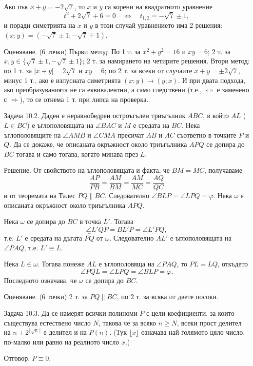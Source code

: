 Ако пък $x+y=-2\sqrt7$, то $x$ и $y$ са корени на квадратното уравнение
$$
t^2+2\sqrt7+6=0\quad\Longleftrightarrow\quad t_{1,2}=-\sqrt7\pm1,
$$
и поради симетрията на $x$ и $y$ в този случай уравнението има 2 решения: $(x;y)=(-\sqrt7\pm1;-\sqrt7\mp1)$.

Оценяване. (6 точки) Първи метод: По 1 т. за $x^2+y^2=16$ и $xy=6$; 2 т. за $x,y\in\{\sqrt7\pm1,-\sqrt7\pm1\}$; 2 т. за намирането на четирите решения. Втори метод: по 1 т. за $|x+y|=2\sqrt7$ и $xy=6$; по 2 т. за всеки от случаите $x+y=\pm2\sqrt7$, минус 1 т., ако е изпусната симетрията $(x;y)\to(y;x)$. И при двата подхода, ако преобразуванията не са еквивалентни, а само следствени (т.е., $\Longleftrightarrow$ е заменено с $\Longrightarrow$), то се отнема 1 т. при липса на проверка.

Задача 10.2. Даден е неравнобедрен остроъгълен триъгълник $ABC$, в който $AL$ ($L\in BC$) е ъглополовящата на $\angle BAC$ и $M$ е средата на $BC$. Нека ъглополовящите на $\angle AMB$ и $\angle CMA$ пресичат $AB$ и $AC$ съответно в точките $P$ и $Q$. Да се докаже, че описаната окръжност около триъгълника $APQ$ се допира до $BC$ тогава и само тогава, когато минава през $L$.

Решение. От свойството на ъглополовящата и факта, че $BM=MC$, получаваме
$$
\frac{AP}{PB}=\frac{AM}{BM}=\frac{AM}{MC}=\frac{AQ}{QC}
$$
и от теоремата на Талес $PQ\parallel BC$. Следователно $\angle BLP=\angle LPQ=\varphi$. Нека $\omega$ е описаната окръжност около триъгълника $APQ$.

Нека $\omega$ се допира до $BC$ в точка $L'$. Тогава
$$
\angle L'QP=BL'P=\angle L'PQ,
$$
т.е. $L'$ е средата на дъгата $\overset{\frown}{PQ}$ от $\omega$. Следователно $AL'$ е ъглополовящата на $\angle PAQ$, т.е. $L'\equiv L$.

Нека $L\in\omega$. Тогава понеже $AL$ е ъглополовяща на $\angle PAQ$, то $PL=LQ$, откъдето
$$
\angle PQL=\angle LPQ=\angle BLP=\varphi.
$$
Последното означава, че $\omega$ се допира до $BC$.

Оценяване. (6 точки) 2 т. за $PQ\parallel BC$, по 2 т. за всяка от двете посоки.

Задача 10.3. Да се намерят всички полиноми $P$ с цели коефициенти, за които съществува естествено число $N$, такова че за всяко $n\geq N$, всеки прост делител на $n+2^{\lfloor\sqrt n\rfloor}$ е делител и на $P(n)$. (Тук $\lfloor x\rfloor$ означава най-голямото цяло число, по-малко или равно на реалното число $x$.)

Отговор. $P\equiv0$.

